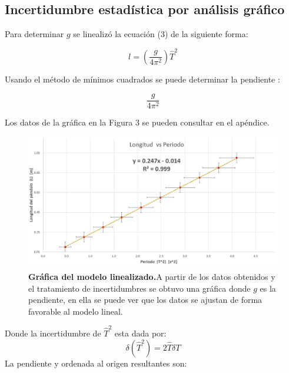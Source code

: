 \documentclass[DIV=calc, paper=a4, fontsize=11pt]{scrartcl}
\begin{document}

\subsection*{ \textcolor{carmine} {Incertidumbre estadística por análisis gráfico}}

Para determinar $g$ se linealizó la ecuación (3) de la siguiente forma:

\begin{equation}
    l = \left(\frac{g}{4\pi^2}\right) \hat{T}^2
\end{equation}

\noindent Usando el método de mínimos cuadrados \nocite{Manual} se puede determinar la pendiente :

\begin{equation*}
    \frac{g}{4 \pi^2}
\end{equation*}

Los datos de la gráfica en la Figura 3 se pueden consultar en el apéndice.



\begin{figure}[H]
    \centering
    \includegraphics[width=15cm]{grafica pendulo optica.PNG}
    \caption{\textbf{Gráfica del modelo linealizado.}A partir de los datos obtenidos y el tratamiento de incertidumbres se obtuvo una gráfica donde $g$ es la pendiente, en ella se puede ver que los datos se ajustan de forma favorable al modelo lineal.}
    \label{fig:my_label}
\end{figure}

Donde la incertidumbre de $\hat{T}^2$ esta dada por:
$$\delta (\hat{T}^2)=2\hat{T}\delta T$$
La pendiente y ordenada al origen resultantes son:
\end{document}
